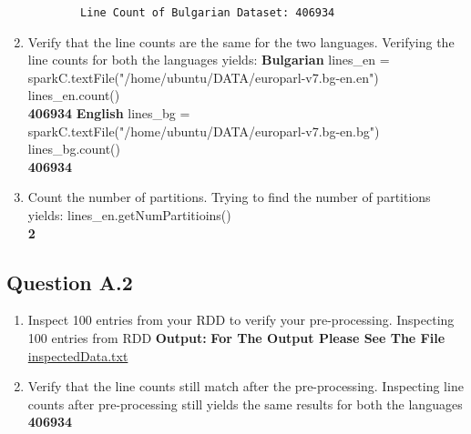 \documentclass[12pt]{article}
\begin{document}
\begin{enumerate}
\begin{lstlisting}
		Line Count of Bulgarian Dataset: 406934
    \end{lstlisting}
\newpage
\item Verify that the line counts are the same for the two languages.
\newline
\newline
	Verifying the line counts for both the languages yields: \cite{DS}
    \newline
    \newline
    \textbf{Bulgarian}
    \newline
		lines\_en = sparkC.textFile("/home/ubuntu/DATA/europarl-v7.bg-en.en") \\
        lines\_en.count() \\
        \textbf{406934}
    \newline
    \newline
    \textbf{English}
    \newline
    	lines\_bg = sparkC.textFile("/home/ubuntu/DATA/europarl-v7.bg-en.bg") \\
        lines\_bg.count() \\
        \textbf{406934}
\newline
\item Count the number of partitions.
\newline
\newline
	Trying to find the number of partitions yields:
    \newline
    \newline
    	lines\_en.getNumPartitioins() \\
        \textbf{2}
\end{enumerate}
\subsection{Question A.2}
\begin{enumerate}
\item Inspect 100 entries from your RDD to verify your pre-processing.
\newline
\newline
	Inspecting 100 entries from RDD
    \newline
    \newline
    \textbf{Output:}
    \newline
    \newline
    \textbf{For The Output Please See The File}
    \newline
    \newline
    \href{run:./inspectedData.txt}{inspectedData.txt}
\newpage
\item Verify that the line counts still match after the pre-processing.
\newline
\newline
	Inspecting line counts after pre-processing still yields the same results for both the languages \\
    \textbf{406934}
\end{enumerate}
\end{document}
